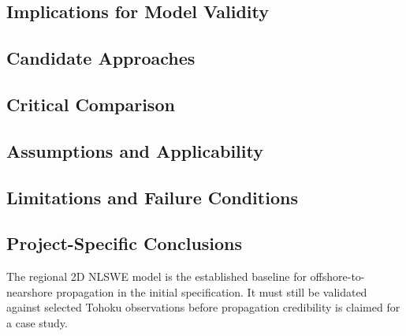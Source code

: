 \subsection{Implications for Model Validity}
\label{sec:res-phy-pro-model-validity-implications}


\subsection{Candidate Approaches}
\label{sec:res-phy-pro-candidate-approaches}


\subsection{Critical Comparison}
\label{sec:res-phy-pro-critical-comparison}


\subsection{Assumptions and Applicability}
\label{sec:res-phy-pro-assumptions}


\subsection{Limitations and Failure Conditions}
\label{sec:res-phy-pro-limitations}


\subsection{Project-Specific Conclusions}
\label{sec:res-phy-pro-conclusions}


The regional 2D NLSWE model is the established baseline for
offshore-to-nearshore propagation in the initial specification. It must
still be validated against selected Tohoku observations before
propagation credibility is claimed for a case study.

